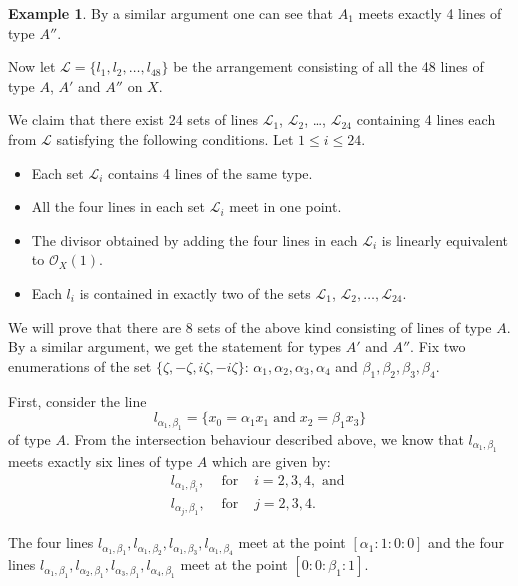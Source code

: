 \documentclass[12pt,reqno]{amsart}
\theoremstyle{plain}
\numberwithin{equation}{section}
\theoremstyle{definition}
\newtheorem{example}[theorem]{Example}
\begin{document}
\begin{example}
			By a similar argument one can see that $A_1$ meets exactly 4 lines of type $A''$. 
		

		Now let $\mathcal{L} = \{l_1,l_2, \ldots,  l_{48}\}$ be the arrangement consisting of all the 48 lines of type $A$, $A'$ and $A''$ on $X$. 
		
		We claim that there exist 24 sets of lines 
		$\mathcal{L}_1$, $\mathcal{L}_2$, \ldots , $\mathcal{L}_{24}$ containing 4 lines each from $\mathcal{L}$
		satisfying the following conditions. Let $1 \le i \le 24$. 
		\begin{itemize}
		\item Each set $\mathcal{L}_i$ contains 4 lines of the same type. 
		\item All the  four lines in each set $\mathcal{L}_i$ meet in one point. 
		\item The divisor obtained by adding the four lines in each  $\mathcal{L}_i$ is linearly equivalent to $\mathcal{O}_X(1)$. 
		\item Each $l_i$ is contained in exactly two of the sets  $\mathcal{L}_1$, $\mathcal{L}_2, \ldots, \mathcal{L}_{24}$. 
	\end{itemize}	
		We will prove that there are 8 sets of the above kind consisting of lines of type $A$. By a similar argument, we get the statement for types $A'$ and $A''$. 
		Fix two enumerations of the set $\{\zeta, -\zeta, i\zeta, -i\zeta \}$: $\alpha_1, \alpha_2, \alpha_3, \alpha_4$ and 
$\beta_1, \beta_2, \beta_3, \beta_4$.

First, consider the line $$l_{\alpha_1,\beta_1} = \{x_0 = \alpha_1 x_1 \; \text{and} \; x_2 = \beta_1 x_3\}$$ of type $A$. From the intersection behaviour described above, we know that $l_{\alpha_1,\beta_1}$  meets exactly six lines of type $A$ which are given by: 
		\begin{eqnarray*} 
		l_{\alpha_1,\beta_i}, &\text{ for }& i=2,3,4, \text{ and }\\
		l_{\alpha_j,\beta_1}, &\text{ for } & j=2,3,4.
		\end{eqnarray*} 
		
The four lines $l_{\alpha_1,\beta_1},l_{\alpha_1,\beta_2},l_{\alpha_1,\beta_3},l_{\alpha_1,\beta_4} $ meet at the point 
 $[\alpha_1 :1 :0 :0]$ and the four lines $l_{\alpha_1,\beta_1},l_{\alpha_2,\beta_1},l_{\alpha_3,\beta_1},l_{\alpha_4,\beta_1}$ meet at the point  $[0 :0 :\beta_1 :1]$.
 

\end{example}
\end{document}
